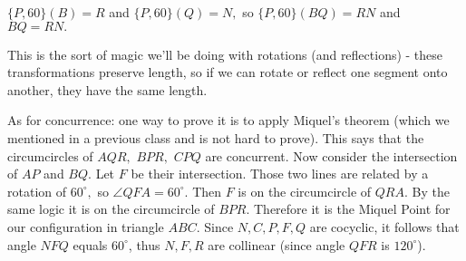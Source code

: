 










$\{P, 60\} (B) = R$ and $\{P, 60\} (Q) = N,$ so $\{P, 60\} (BQ) = RN$ and $BQ = RN.$

This is the sort of magic we'll be doing with rotations (and reflections) - these transformations preserve length, so if we can rotate or reflect one segment onto another, they have the same length.

As for concurrence: one way to prove it is to apply Miquel's theorem (which we mentioned in a previous class and is not hard to prove).  This says that the circumcircles of $AQR,$ $BPR,$ $CPQ$ are concurrent.  Now consider the intersection of $AP$ and $BQ.$  Let $F$ be their intersection.  Those two lines are related by a rotation of $60^\circ,$ so $\angle QFA=60^\circ.$  Then $F$ is on the circumcircle of $QRA.$  By the same logic it is on the circumcircle of $BPR.$  Therefore it is the Miquel Point for our configuration in triangle $ABC$. Since $N,C,P,F,Q$ are cocyclic, it follows that angle $NFQ$ equals $60^\circ$, thus $N,F,R$ are collinear (since angle $QFR$ is $120^\circ$).

